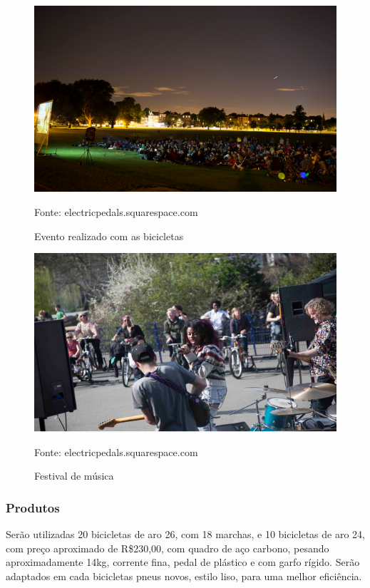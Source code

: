 \begin{figure}[H]
	 \centering
	\label{Evento realizado com as bicicletas}
	 \includegraphics[keepaspectratio=true,scale=0.8]{figuras/TelaoFuncionamentoEnergiaBicicleta2.png}
	 \caption{Evento realizado com as bicicletas}
	 \small{Fonte: electricpedals.squarespace.com}
\end{figure}

\begin{figure}[H]
	 \centering
	\label{Festival de música}
	 \includegraphics[keepaspectratio=true,scale=0.8]{figuras/TelaoFuncionamentoEnergiaBicicleta3.png}
	 \caption{Festival de música}
	 \small{Fonte: electricpedals.squarespace.com}
\end{figure}

\subsubsection{Produtos}

	Serão utilizadas 20 bicicletas de aro 26, com 18 marchas, e 10 bicicletas de aro 24, com preço aproximado de R\$230,00, com quadro de aço carbono, pesando aproximadamente 14kg, corrente fina, pedal de plástico e com garfo rígido. Serão adaptados em cada bicicletas pneus novos, estilo liso, para uma melhor eficiência. 
	
